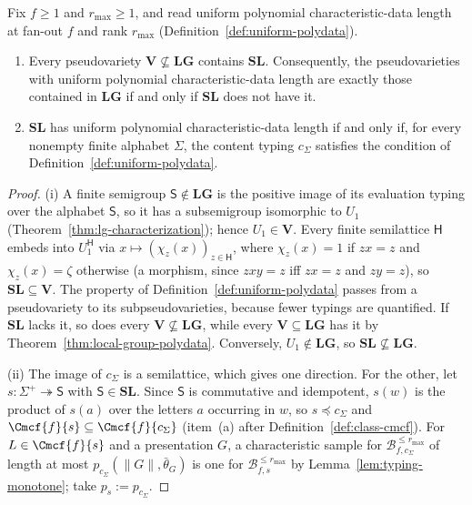 \begin{proposition}
\label{prop:sl-reduction}
Fix $f\ge1$ and $r_{\max}\ge1$, and read uniform polynomial characteristic-data
length at fan-out $f$ and rank $r_{\max}$
(Definition~\ref{def:uniform-polydata}).
\begin{enumerate}[label=\textup{(\roman*)},leftmargin=*]
\item Every pseudovariety $\mathbf V\not\subseteq\mathbf{LG}$ contains
$\mathbf{SL}$.  Consequently, the pseudovarieties with uniform polynomial
characteristic-data length are exactly those contained in $\mathbf{LG}$ if and
only if $\mathbf{SL}$ does not have it.
\item $\mathbf{SL}$ has uniform polynomial characteristic-data length if and
only if, for every nonempty finite alphabet $\Sigma$, the content typing
$c_\Sigma$ satisfies the condition of Definition~\ref{def:uniform-polydata}.
\end{enumerate}
\end{proposition}

\begin{proof}
(i) A finite semigroup $\mathsf S\notin\mathbf{LG}$ is the positive image of
its evaluation typing over the alphabet $\mathsf S$, so it has a subsemigroup
isomorphic to $U_1$ (Theorem~\ref{thm:lg-characterization}); hence
$U_1\in\mathbf V$.  Every finite semilattice $\mathsf H$ embeds into
$U_1^{\mathsf H}$ via $x\mapsto(\chi_z(x))_{z\in\mathsf H}$, where $\chi_z(x)=1$ if
$zx=z$ and $\chi_z(x)=\zeta$ otherwise (a morphism, since $zxy=z$ iff $zx=z$ and
$zy=z$), so $\mathbf{SL}\subseteq\mathbf V$.  The property of
Definition~\ref{def:uniform-polydata} passes from a pseudovariety to its
subpseudovarieties, because fewer typings are quantified.  If $\mathbf{SL}$
lacks it, so does every $\mathbf V\not\subseteq\mathbf{LG}$, while every
$\mathbf V\subseteq\mathbf{LG}$ has it by Theorem~\ref{thm:local-group-polydata}.
Conversely, $U_1\notin\mathbf{LG}$, so $\mathbf{SL}\not\subseteq\mathbf{LG}$.

(ii) The image of $c_\Sigma$ is a semilattice, which gives one direction.  For
the other, let $s:\Sigma^+\twoheadrightarrow\mathsf S$ with $\mathsf S\in\mathbf{SL}$.
Since $\mathsf S$ is commutative and idempotent, $s(w)$ is the product of
$s(a)$ over the letters $a$ occurring in $w$, so $s\preceq c_\Sigma$ and
$\Cmcf{f}{s}\subseteq\Cmcf{f}{c_\Sigma}$ (item~(a) after
Definition~\ref{def:class-cmcf}).  For $L\in\Cmcf{f}{s}$ and a presentation $G$,
a characteristic sample for $\mathcal B^{\le r_{\max}}_{f,c_\Sigma}$ of length at
most $p_{c_\Sigma}(\|G\|,\bar\theta_G)$ is one for
$\mathcal B^{\le r_{\max}}_{f,s}$ by Lemma~\ref{lem:typing-monotone}; take
$p_{s}:=p_{c_\Sigma}$.
\end{proof}

